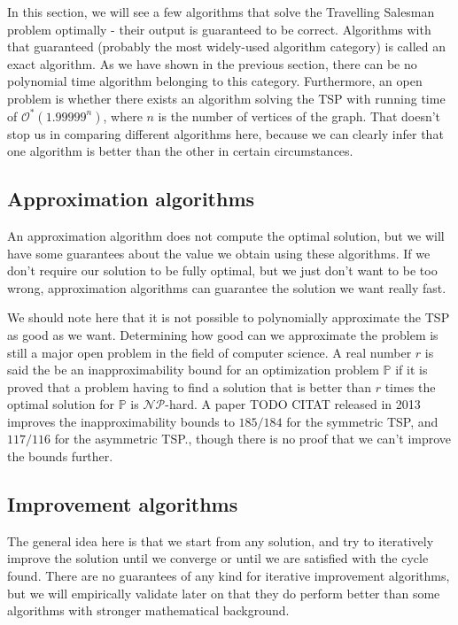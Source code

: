 \documentclass[12pt,twoside,notitlepage]{report}
\begin{document}
In this section, we will see a few algorithms that solve the Travelling Salesman problem optimally - their output is guaranteed to be correct. Algorithms with that guaranteed (probably the most widely-used algorithm category) is called an exact algorithm. As we have shown in the previous section, there can be no polynomial time algorithm belonging to this category. Furthermore, an open problem is whether there exists an algorithm solving the TSP with running time of $\mathcal{O^{*}}(1.99999^{n})$\cite{Woeginger2003}, where $n$ is the number of vertices of the graph. That doesn't stop us in comparing different algorithms here, because we can clearly infer that one algorithm is better than the other in certain circumstances.

\subsection{Approximation algorithms}

An approximation algorithm does not compute the optimal solution, but we will have some guarantees about the value we obtain using these algorithms. If we don't require our solution to be fully optimal, but we just don't want to be too wrong, approximation algorithms can guarantee the solution we want really fast.

\smallskip

We should note here that it is not possible to polynomially approximate the TSP as good as we want. Determining how good can we approximate the problem is still a major open problem in the field of computer science. A real number $r$ is said the be an inapproximability bound for an optimization problem $\mathbb{P}$ if it is proved that a problem having to find a solution that is better than $r$ times the optimal solution for $\mathbb{P}$ is $\mathcal{NP}$-hard. A paper TODO CITAT released in 2013 improves the inapproximability bounds to $185/184$ for the symmetric TSP, and $117/116$ for the asymmetric TSP., though there is no proof that we can't improve the bounds further.


\subsection{Improvement algorithms}

The general idea here is that we start from any solution, and try to iteratively improve the solution until we converge or until we are satisfied with the cycle found. There are no guarantees of any kind for iterative improvement algorithms, but we will empirically validate later on that they do perform better than some algorithms with stronger mathematical background.
\end{document}
